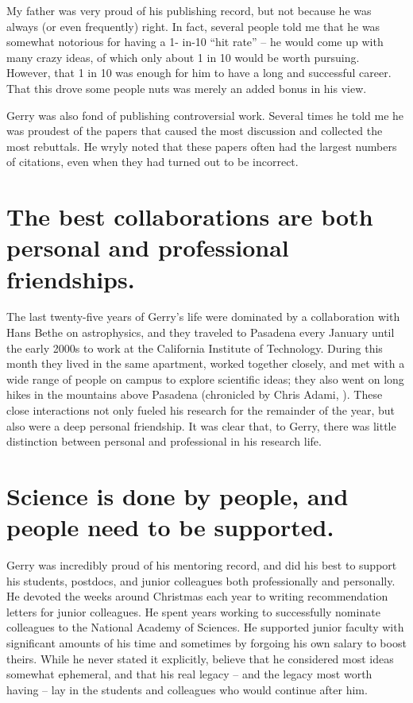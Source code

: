 My father was very proud of his publishing record, but not because he
was always (or even frequently) right. In fact, several people told me
that he was somewhat notorious for having a 1- in-10 ``hit rate'' -- he
would come up with many crazy ideas, of which only about 1 in 10 would
be worth pursuing. However, that 1 in 10 was enough for him to have a
long and successful career.  That this drove some people nuts was
merely an added bonus in his view.

Gerry was also fond of publishing controversial work. Several times he
told me he was proudest of the papers that caused the most discussion
and collected the most rebuttals. He wryly noted that these
papers often had the largest numbers of citations, even when they had
turned out to be incorrect.

\section*{The best collaborations are both personal and professional
friendships.}

The last twenty-five years of Gerry's life were dominated by a
collaboration with Hans Bethe on astrophysics, and they traveled to
Pasadena every January until the early 2000s to work at the California
Institute of Technology. During this month they lived in the same
apartment, worked together closely, and met with a wide range of
people on campus to explore scientific ideas; they also went on long
hikes in the mountains above Pasadena (chronicled by Chris Adami,
\cite{adami2006three}). These close interactions not only fueled his
research for the remainder of the year, but also were a deep personal
friendship. It was clear that, to Gerry, there was little distinction
between personal and professional in his research life.

\section*{Science is done by people, and people need to be supported.}

Gerry was incredibly proud of his mentoring record, and did his best
to support his students, postdocs, and junior colleagues both
professionally and personally. He devoted the weeks around Christmas
each year to writing recommendation letters for junior colleagues. He
spent years working to successfully nominate colleagues to the
National Academy of Sciences. He supported junior faculty with
significant amounts of his time and sometimes by forgoing his own
salary to boost theirs. While he never stated it explicitly, believe
that he considered most ideas somewhat ephemeral, and that his real
legacy --  and the legacy most worth having -- lay in the students and
colleagues who would continue after him.

